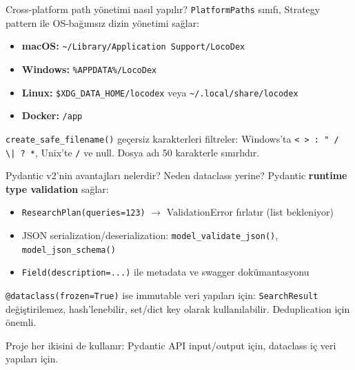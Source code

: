 \begin{mulakat}{Cross-platform path y\"{o}netimi nas{\i}l yap{\i}l{\i}r?}
\texttt{PlatformPaths} s{\i}n{\i}f{\i}, Strategy pattern ile OS-ba\u{g}{\i}ms{\i}z dizin y\"{o}netimi sa\u{g}lar:

\begin{itemize}
  \item \textbf{macOS:} \texttt{\textasciitilde/Library/Application Support/LocoDex}
  \item \textbf{Windows:} \texttt{\%APPDATA\%/LocoDex}
  \item \textbf{Linux:} \texttt{\$XDG\_DATA\_HOME/locodex} veya \texttt{\textasciitilde/.local/share/locodex}
  \item \textbf{Docker:} \texttt{/app}
\end{itemize}

\texttt{create\_safe\_filename()} ge\c{c}ersiz karakterleri filtreler: Windows'ta \texttt{< > : " / \textbackslash | ? *}, Unix'te \texttt{/} ve null. Dosya ad{\i} 50 karakterle s{\i}n{\i}rl{\i}d{\i}r.
\end{mulakat}

\begin{mulakat}{Pydantic v2'nin avantajlar{\i} nelerdir? Neden dataclass yerine?}
Pydantic \textbf{runtime type validation} sa\u{g}lar:
\begin{itemize}
  \item \texttt{ResearchPlan(queries=123)} $\rightarrow$ ValidationError f{\i}rlat{\i}r (list bekleniyor)
  \item JSON serialization/deserialization: \texttt{model\_validate\_json()}, \texttt{model\_json\_schema()}
  \item \texttt{Field(description=...)} ile metadata ve swagger dok\"{u}mantasyonu
\end{itemize}

\texttt{@dataclass(frozen=True)} ise immutable veri yap{\i}lar{\i} i\c{c}in: \texttt{SearchResult} de\u{g}i\c{s}tirilemez, hash'lenebilir, set/dict key olarak kullan{\i}labilir. Deduplication i\c{c}in \"{o}nemli.

Proje her ikisini de kullan{\i}r: Pydantic API input/output i\c{c}in, dataclass i\c{c} veri yap{\i}lar{\i} i\c{c}in.
\end{mulakat}

